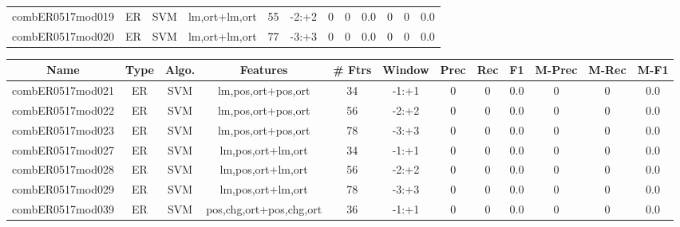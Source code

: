 \documentclass[a4paper]{article}
\begin{document}
\begin{landscape}
\begin{center}
\begin{tabular}{ |c|c|c|c|c|c|c|c|c|c|c|c|}
 
 	
 	\small{ combER0517mod019 } & ER & SVM & lm,ort+lm,ort  &  55 &  -2:+2  &  0 & 0 & 0.0  &  0 & 0 & 0.0 \\
 	

 
 	
 	\small{ combER0517mod020 } & ER & SVM & lm,ort+lm,ort  &  77 &  -3:+3  &  0 & 0 & 0.0  &  0 & 0 & 0.0 \\
 	
 \hline
\end{tabular}
\end{center}




\begin{center}
\begin{tabular}{ |c|c|c|c|c|c|c|c|c|c|c|c|} 
 \hline
 	Name & Type & Algo. & Features & \# Ftrs & Window & Prec & Rec & F1 & M-Prec & M-Rec & M-F1\\
 \hline

 	

 
 	
 	\small{ combER0517mod021 } & ER & SVM & lm,pos,ort+pos,ort  &  34 &  -1:+1  &  0 & 0 & 0.0  &  0 & 0 & 0.0 \\
 	

 
 	
 	\small{ combER0517mod022 } & ER & SVM & lm,pos,ort+pos,ort  &  56 &  -2:+2  &  0 & 0 & 0.0  &  0 & 0 & 0.0 \\
 	

 
 	
 	\small{ combER0517mod023 } & ER & SVM & lm,pos,ort+pos,ort  &  78 &  -3:+3  &  0 & 0 & 0.0  &  0 & 0 & 0.0 \\
 	

 
 	
 	\small{ combER0517mod027 } & ER & SVM & lm,pos,ort+lm,ort  &  34 &  -1:+1  &  0 & 0 & 0.0  &  0 & 0 & 0.0 \\
 	

 
 	
 	\small{ combER0517mod028 } & ER & SVM & lm,pos,ort+lm,ort  &  56 &  -2:+2  &  0 & 0 & 0.0  &  0 & 0 & 0.0 \\
 	

 
 	
 	\small{ combER0517mod029 } & ER & SVM & lm,pos,ort+lm,ort  &  78 &  -3:+3  &  0 & 0 & 0.0  &  0 & 0 & 0.0 \\
 	

 
 	
 	\small{ combER0517mod039 } & ER & SVM & pos,chg,ort+pos,chg,ort  &  36 &  -1:+1  &  0 & 0 & 0.0  &  0 & 0 & 0.0 \\
 	


\end{tabular}
\end{center}
\end{landscape}
\end{document}
